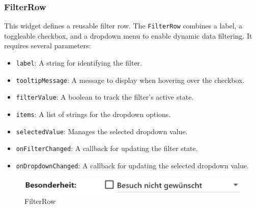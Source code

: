 \subsubsection{FilterRow}
\label{fig:FilterRow}

This widget defines a reusable filter row. The \texttt{FilterRow} combines a label, a toggleable checkbox, and a dropdown menu to enable dynamic data filtering. It requires several parameters:
\begin{itemize}
    \item \texttt{label}: A string for identifying the filter.
    \item \texttt{tooltipMessage}: A message to display when hovering over the checkbox.
    \item \texttt{filterValue}: A boolean to track the filter's active state.
    \item \texttt{items}: A list of strings for the dropdown options.
    \item \texttt{selectedValue}: Manages the selected dropdown value.
    \item \texttt{onFilterChanged}: A callback for updating the filter state. 
    \item \texttt{onDropdownChanged}: A callback for updating the selected dropdown value.
\end{itemize}


\begin{figure}[H]
    \centering
    \includegraphics[width=0.5\linewidth]{images/AdminPanel/FilterRow.png}
    \caption{FilterRow}
\end{figure}

